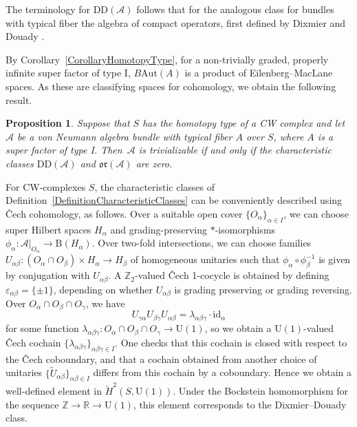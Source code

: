\documentclass[11pt]{article}
\numberwithin{equation}{section}
\numberwithin{equation}{section}
\newtheorem{Proposition}[Theorem]{Proposition}
\newcommand{\R}{\mathbb{R}}
\newcommand{\Z}{\mathbb{Z}}
\newcommand{\B}{\mathrm{B}}
\newcommand{\A}{\mathcal{A}}
\newcommand{\Aut}{\mathrm{Aut}}
\newcommand{\U}{\mathrm{U}}
\newcommand{\DD}{\mathrm{DD}}
\newcommand{\oclass}{\mathfrak{or}}
\begin{document}
The terminology for $\DD(\A)$ follows that for the analogous class for bundles with typical fiber the algebra of compact operators, first defined by Dixmier and Douady \cite{DixmierDouady}.

By Corollary~\ref{CorollaryHomotopyType}, for a non-trivially graded, properly infinite super factor of type I, $B\Aut(A)$ is a product of Eilenberg--MacLane spaces.
As these are classifying spaces for cohomology, we obtain the following result.

\begin{Proposition}
Suppose that $S$ has the homotopy type of a CW complex and let $\A$ be a von Neumann algebra bundle with typical fiber $A$ over $S$, where $A$ is a super factor of type I.
Then~$\A$ is trivializable if and only if the characteristic classes $\DD(\A)$ and $\oclass(\A)$ are zero.
\end{Proposition}

\begin{Remark} \label{RemarkCheckPicture}
For CW-complexes $S$, the characteristic classes of Definition~\ref{DefinitionCharacteristicClasses} can be conveniently described using \v{C}ech cohomology, as follows.
Over a suitable open cover $\{O_\alpha\}_{\alpha \in I}$, we can choose super Hilbert spaces $H_\alpha$ and grading-preserving $*$-isomorphisms $\phi_\alpha\colon \mathcal{A}|_{O_\alpha} \to \B(H_\alpha)$.
Over two-fold intersections, we can choose families $U_{\alpha\beta}\colon (O_\alpha \cap O_\beta) \times H_\alpha \to H_\beta$ of homogeneous unitaries such that $\phi_\alpha \circ \phi_\beta^{-1}$ is given by conjugation with $U_{\alpha\beta}$.
A $\Z_2$-valued \v{C}ech 1-cocycle is obtained by defining $\varepsilon_{\alpha\beta} = \{\pm 1\}$, depending on whether $U_{\alpha\beta}$ is grading preserving or grading reversing.
Over $O_\alpha \cap O_\beta \cap O_\gamma$, we have
\begin{equation*}
U_{\gamma \alpha} U_{\beta\gamma} U_{\alpha\beta} = \lambda_{\alpha\beta\gamma} \cdot \mathrm{id}_\alpha
\end{equation*}
for some function $\lambda_{\alpha\beta\gamma} \colon O_\alpha \cap O_\beta \cap O_\gamma \to \U(1)$, so we obtain a $\U(1)$-valued \v{C}ech cochain $\{\lambda_{\alpha\beta\gamma}\}_{\alpha\beta\gamma\in I}$.
One checks that this cochain is closed with respect to the \v{C}ech coboundary, and that a cochain obtained from another choice of unitaries $\{\tilde{U}_{\alpha\beta}\}_{\alpha \beta \in I}$ differs from this cochain by a coboundary.
Hence we obtain a well-defined element in $\check{H}^2(S, \U(1))$.
Under the Bockstein homomorphism for the sequence $\Z \to \R \to \U(1)$, this element corresponds to the Dixmier--Douady class.
\end{Remark}
\end{document}
